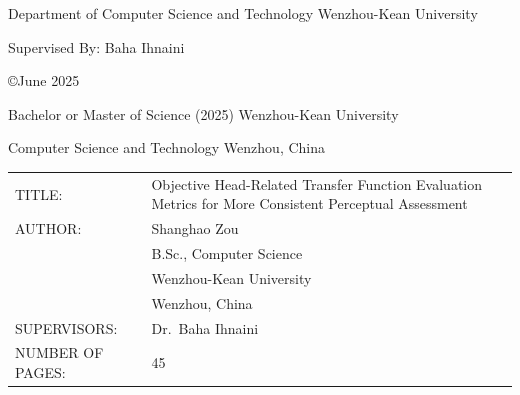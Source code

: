 \documentclass[12pt,a4paper]{article}
\begin{document}
\vspace{1cm}

\begin{center}
Department of Computer Science and Technology Wenzhou-Kean University
\end{center}

\vspace{0.5cm}

\begin{center}
Supervised By: Baha Ihnaini
\end{center}

\vfill  %

\newpage
\thispagestyle{empty}
\setcounter{page}{2}

\vspace*{2cm}

\begin{center}
\copyright June 2025
\end{center}

\vspace{3cm}

\noindent Bachelor or Master of Science (2025) \hfill Wenzhou-Kean University

\vspace{0.3cm}

\noindent Computer Science and Technology \hfill Wenzhou, China

\vspace{1.5cm}

\noindent
\begin{tabular}{@{}p{4.5cm}p{9.5cm}@{}}
TITLE: & Objective Head-Related Transfer Function Evaluation Metrics for More Consistent Perceptual Assessment \\[1em]
AUTHOR: & Shanghao Zou \\
         & B.Sc., Computer Science \\
         & Wenzhou-Kean University \\
         & Wenzhou, China \\[1em]
SUPERVISORS: & Dr.\ Baha Ihnaini \\[1.5em]
NUMBER OF PAGES: & 45 \\
\end{tabular}

\vfill

\newpage
\end{document}

